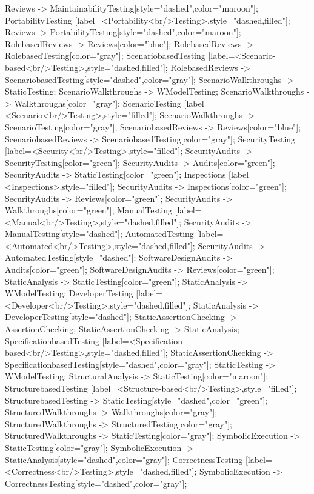 \documentclass{article}
\begin{document}
{Reviews -> MaintainabilityTesting[style="dashed",color="maroon"];
PortabilityTesting [label=<Portability<br/>Testing>,style="dashed,filled"];
Reviews -> PortabilityTesting[style="dashed",color="maroon"];
RolebasedReviews -> Reviews[color="blue"];
RolebasedReviews -> RolebasedTesting[color="gray"];
ScenariobasedTesting [label=<Scenario-based<br/>Testing>,style="dashed,filled"];
RolebasedReviews -> ScenariobasedTesting[style="dashed",color="gray"];
ScenarioWalkthroughs -> StaticTesting;
ScenarioWalkthroughs -> WModelTesting;
ScenarioWalkthroughs -> Walkthroughs[color="gray"];
ScenarioTesting [label=<Scenario<br/>Testing>,style="filled"];
ScenarioWalkthroughs -> ScenarioTesting[color="gray"];
ScenariobasedReviews -> Reviews[color="blue"];
ScenariobasedReviews -> ScenariobasedTesting[color="gray"];
SecurityTesting [label=<Security<br/>Testing>,style="filled"];
SecurityAudits -> SecurityTesting[color="green"];
SecurityAudits -> Audits[color="green"];
SecurityAudits -> StaticTesting[color="green"];
Inspections [label=<Inspections>,style="filled"];
SecurityAudits -> Inspections[color="green"];
SecurityAudits -> Reviews[color="green"];
SecurityAudits -> Walkthroughs[color="green"];
ManualTesting [label=<Manual<br/>Testing>,style="dashed,filled"];
SecurityAudits -> ManualTesting[style="dashed"];
AutomatedTesting [label=<Automated<br/>Testing>,style="dashed,filled"];
SecurityAudits -> AutomatedTesting[style="dashed"];
SoftwareDesignAudits -> Audits[color="green"];
SoftwareDesignAudits -> Reviews[color="green"];
StaticAnalysis -> StaticTesting[color="green"];
StaticAnalysis -> WModelTesting;
DeveloperTesting [label=<Developer<br/>Testing>,style="dashed,filled"];
StaticAnalysis -> DeveloperTesting[style="dashed"];
StaticAssertionChecking -> AssertionChecking;
StaticAssertionChecking -> StaticAnalysis;
SpecificationbasedTesting [label=<Specification-based<br/>Testing>,style="dashed,filled"];
StaticAssertionChecking -> SpecificationbasedTesting[style="dashed",color="gray"];
StaticTesting -> WModelTesting;
StructuralAnalysis -> StaticTesting[color="maroon"];
StructurebasedTesting [label=<Structure-based<br/>Testing>,style="filled"];
StructurebasedTesting -> StaticTesting[style="dashed",color="green"];
StructuredWalkthroughs -> Walkthroughs[color="gray"];
StructuredWalkthroughs -> StructuredTesting[color="gray"];
StructuredWalkthroughs -> StaticTesting[color="gray"];
SymbolicExecution -> StaticTesting[color="gray"];
SymbolicExecution -> StaticAnalysis[style="dashed",color="gray"];
CorrectnessTesting [label=<Correctness<br/>Testing>,style="dashed,filled"];
SymbolicExecution -> CorrectnessTesting[style="dashed",color="gray"];
}
\end{document}
